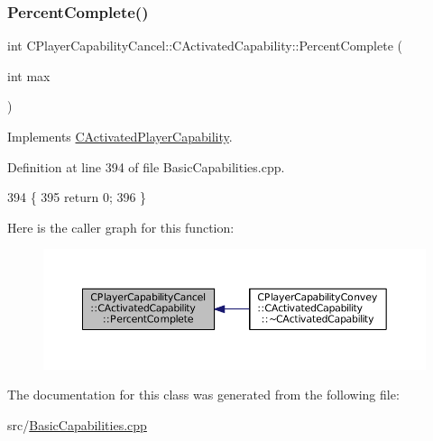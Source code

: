 \hypertarget{classCPlayerCapabilityCancel_1_1CActivatedCapability_a69d2fec27186cba11ab545560e7bf45d}{}\label{classCPlayerCapabilityCancel_1_1CActivatedCapability_a69d2fec27186cba11ab545560e7bf45d} 
\subsubsection{\texorpdfstring{Percent\+Complete()}{PercentComplete()}}
{\footnotesize\ttfamily int C\+Player\+Capability\+Cancel\+::\+C\+Activated\+Capability\+::\+Percent\+Complete (\begin{DoxyParamCaption}\item[{int}]{max }\end{DoxyParamCaption})\hspace{0.3cm}{\ttfamily [virtual]}}



Implements \hyperlink{classCActivatedPlayerCapability_a405dc6076058006a4f801727de4cfe4d}{C\+Activated\+Player\+Capability}.



Definition at line 394 of file Basic\+Capabilities.\+cpp.


\begin{DoxyCode}
394                                                                        \{
395     \textcolor{keywordflow}{return} 0;
396 \}
\end{DoxyCode}
Here is the caller graph for this function\+:
\nopagebreak
\begin{figure}[H]
\begin{center}
\leavevmode
\includegraphics[width=350pt]{classCPlayerCapabilityCancel_1_1CActivatedCapability_a69d2fec27186cba11ab545560e7bf45d_icgraph}
\end{center}
\end{figure}


The documentation for this class was generated from the following file\+:\begin{DoxyCompactItemize}
\item 
src/\hyperlink{BasicCapabilities_8cpp}{Basic\+Capabilities.\+cpp}\end{DoxyCompactItemize}
